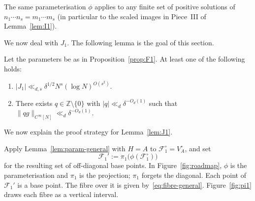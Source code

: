 \begin{remark}\label{rem:param-remark}
The same parameterisation $\phi$ applies to any finite set of positive solutions of
$n_1\cdots n_s=m_1\cdots m_s$
(in particular to the scaled images in Piece~III of Lemma~\ref{lem:I1}).
\end{remark}

We now deal with $J_1$. The following lemma is the goal of this section.

\begin{lemma}\label{lem:J1}
Let the parameters be as in Proposition~\ref{prop:F1}.
At least one of the following holds:
\begin{enumerate}
    \item $|J_1|\ll_{d,s} \delta^{1/2} N^s(\log N)^{O(s^2)}$.
    \item There exists $q\in\mathbb{Z}\setminus\{0\}$ with $|q|\ll_d\delta^{-O_d(1)}$ such that $\|qg\|_{C^\infty[N]}\ll_d\delta^{-O_d(1)}$.
\end{enumerate}
\end{lemma}

We now explain the proof strategy for Lemma~\ref{lem:J1}.

Apply Lemma~\ref{lem:param-general} with $H=A$ to
$\mathscr{F}_1^\circ=V_A^\circ$, and set
\[
\mathscr{F}_1'
:=\pi_1\bigl(\phi(\mathscr{F}_1^\circ)\bigr)
\]
for the resulting set of off-diagonal base points.
In Figure~\ref{fig:roadmap}, \(\phi\) is the parameterisation and \(\pi_1\) is the projection; \(\pi_1\) forgets the diagonal.
Each point of \(\mathscr{F}_1'\) is a base point.  The fibre over it is given by~\eqref{eq:fibre-general}.  Figure~\ref{fig:pi1} draws each fibre as a vertical interval.

